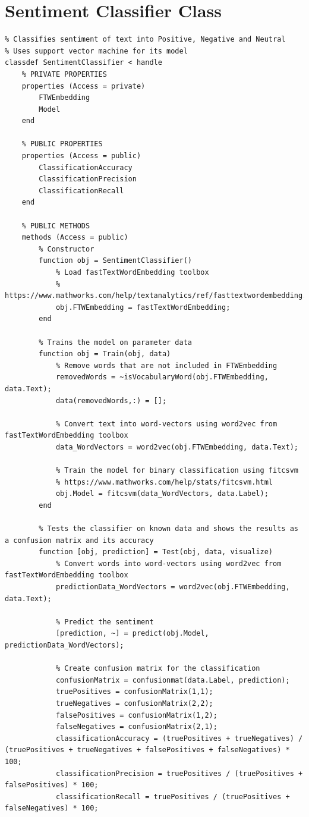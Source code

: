 \documentclass[12pt,journal,compsoc]{IEEEtran}
\begin{document}
\section{Sentiment Classifier Class}
\begin{lstlisting}[basicstyle=\small, breaklines=true, postbreak=\mbox{\textcolor{red}{$\hookrightarrow$}\space}]
% Sentiment classifier class
% Classifies sentiment of text into Positive, Negative and Neutral
% Uses support vector machine for its model
classdef SentimentClassifier < handle
    % PRIVATE PROPERTIES
    properties (Access = private)
        FTWEmbedding
        Model
    end

    % PUBLIC PROPERTIES
    properties (Access = public)
        ClassificationAccuracy
        ClassificationPrecision
        ClassificationRecall
    end

    % PUBLIC METHODS
    methods (Access = public)
        % Constructor
        function obj = SentimentClassifier()
            % Load fastTextWordEmbedding toolbox
            % https://www.mathworks.com/help/textanalytics/ref/fasttextwordembedding.html
            obj.FTWEmbedding = fastTextWordEmbedding;
        end

        % Trains the model on parameter data
        function obj = Train(obj, data)
            % Remove words that are not included in FTWEmbedding
            removedWords = ~isVocabularyWord(obj.FTWEmbedding, data.Text);
            data(removedWords,:) = [];

            % Convert text into word-vectors using word2vec from fastTextWordEmbedding toolbox
            data_WordVectors = word2vec(obj.FTWEmbedding, data.Text);

            % Train the model for binary classification using fitcsvm
            % https://www.mathworks.com/help/stats/fitcsvm.html
            obj.Model = fitcsvm(data_WordVectors, data.Label);
        end

        % Tests the classifier on known data and shows the results as a confusion matrix and its accuracy
        function [obj, prediction] = Test(obj, data, visualize)
            % Convert words into word-vectors using word2vec from fastTextWordEmbedding toolbox
            predictionData_WordVectors = word2vec(obj.FTWEmbedding, data.Text);
            
            % Predict the sentiment
            [prediction, ~] = predict(obj.Model, predictionData_WordVectors);

            % Create confusion matrix for the classification
            confusionMatrix = confusionmat(data.Label, prediction);
            truePositives = confusionMatrix(1,1);
            trueNegatives = confusionMatrix(2,2);
            falsePositives = confusionMatrix(1,2);
            falseNegatives = confusionMatrix(2,1);
            classificationAccuracy = (truePositives + trueNegatives) / (truePositives + trueNegatives + falsePositives + falseNegatives) * 100;
            classificationPrecision = truePositives / (truePositives + falsePositives) * 100;
            classificationRecall = truePositives / (truePositives + falseNegatives) * 100;


\end{lstlisting}
\end{document}
